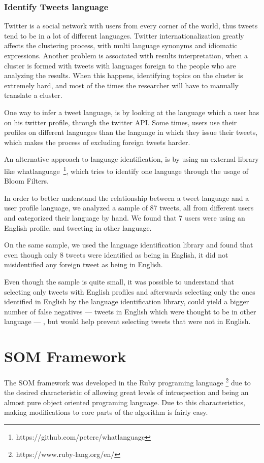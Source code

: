 \documentclass[journal]{IEEEtran}
\begin{document}
\subsubsection{Identify Tweets language}
\label{sub:identify_tweets_lang}
Twitter is a social network with users from every corner of the world, thus tweets tend to be in a lot of different languages. Twitter internationalization greatly affects the clustering process, with multi language synonyms and idiomatic expressions. Another problem is associated with results interpretation, when a cluster is formed with tweets with languages foreign to the people who are analyzing the results. When this happens, identifying topics on the cluster is extremely hard, and most of the times the researcher will have to manually translate a cluster.  

One way to infer a tweet language, is by looking at the language which a user has on his twitter profile, through the twitter API. Some times, users use their profiles on different languages than the language in which they issue their tweets, which makes the process of excluding foreign tweets harder.

An alternative approach to language identification, is by using an external library like whatlanguage~\footnote{https://github.com/peterc/whatlanguage}, which tries to identify one language through the usage of Bloom Filters.  

In order to better understand the relationship between a tweet language and a user profile language, we analyzed a sample of 87 tweets, all from different users and categorized their language by hand. We found that 7 users were using an English profile, and tweeting in other language.

On the same sample, we used the language identification library and found that even though only 8 tweets were identified as being in English, it did not misidentified any foreign tweet as being in English.

Even though the sample is quite small, it was possible to understand that selecting only tweets with English profiles and afterwards selecting only the ones identified in English by the language identification library, could yield a bigger number of false negatives --- tweets in English which were thought to be in other language ---  , but would help prevent selecting tweets that were not in English.
 
\section{SOM Framework}
\label{sec:som_framework}
The \ac{SOM} framework was developed in the Ruby programing language \footnote{https://www.ruby-lang.org/en/} due to the desired characteristic of allowing great levels of introspection and being an almost pure object oriented programing language. Due to this characteristics, making modifications to core parts of the algorithm is fairly easy.
\end{document}
